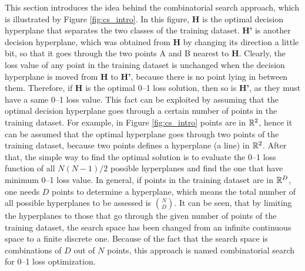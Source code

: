 This section introduces the idea behind the combinatorial search approach, which is illustrated by Figure \ref{fig:cs_intro}. In this figure, {\bf H} is the optimal decision hyperplane that separates the two classes of the training dataset. {\bf H'} is another decision hyperplane, which was obtained from {\bf H} by changing its direction a little bit, so that it goes through the two  points A and B nearest to {\bf H}. Clearly, the loss value of any point in the training dataset is unchanged when the decision hyperplane is moved from {\bf H} to {\bf H'}, because there is no point lying in between them. Therefore, if {\bf H} is the optimal 0--1 loss solution, then so is {\bf H'}, as they must have a same 0--1 loss value. This fact can be exploited by assuming that the optimal decision hyperplane goes through a certain number of points in the training dataset. For example, in Figure \ref{fig:cs_intro} points are in $\mathbb{R}^2$, hence it can be assumed that the optimal hyperplane goes through two points of the training dataset, because two points defines a hyperplane (a line) in $\mathbb{R}^2$. After that, the simple way to find the optimal solution is to evaluate the 0--1 loss function of all $N(N-1)/2$ possible hyperplanes and find the one that have minimum 0--1 loss value. In general, if points in the training dataset are in $\mathbb{R}^D$, one needs $D$ points to determine a hyperplane, which means the total number of all possible hyperplanes to be assessed is ${N \choose D}$. It can be seen, that by limiting the hyperplanes to those that go through the given number of points of the training dataset, the search space has been changed from an infinite continuous space to a finite discrete one. Because of the fact that the search space is combinations of $D$ out of $N$ points, this approach is named combinatorial search for 0--1 loss optimization. 

